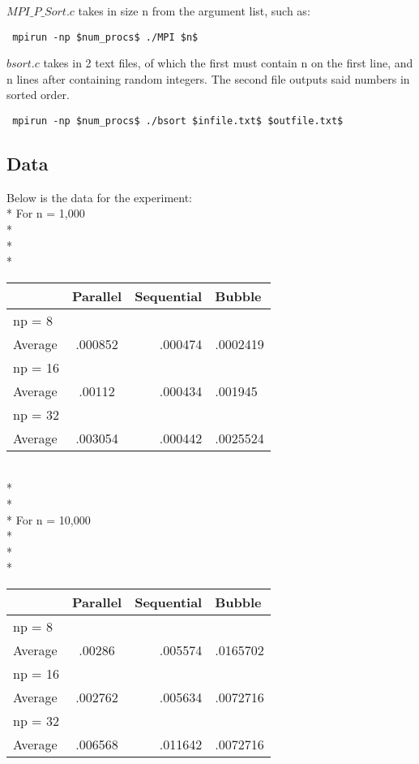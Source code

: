 \documentclass[dvips]{article}
\begin{document}
 $MPI\_P\_Sort.c$ takes in size n from the argument list, such as:
 \begin{verbatim}
 mpirun -np $num_procs$ ./MPI $n$
 \end{verbatim}

 $bsort.c$ takes in 2 text files, of which the first must contain n on the first line, and n lines after containing random integers.
 The second file outputs said numbers in sorted order.
 \begin{verbatim}
 mpirun -np $num_procs$ ./bsort $infile.txt$ $outfile.txt$
 \end{verbatim}

\subsection{Data}
Below is the data for the experiment:
\\*
For n = 1,000
\\*
\\*
\\*
\begin{tabular}{ l | c r l }
   & Parallel & Sequential & Bubble \\
  \hline
  np = 8  &  &  & \\
  Average & .000852 & .000474 & .0002419 \\
  \hline
  np = 16  &  &  & \\
  Average & .00112& .000434 & .001945 \\
  \hline
  np = 32  &  &  & \\
  Average & .003054 & .000442 & .0025524 \\
\end{tabular}
\\*
\\*
\\*
For n = 10,000
\\*
\\*
\\*
\begin{tabular}{ l | c r l }
   & Parallel & Sequential & Bubble \\
  \hline
  np = 8  &  &  & \\
  Average & .00286 & .005574 & .0165702 \\
  \hline
  np = 16  &  &  & \\
  Average & .002762 & .005634 & .0072716 \\
  \hline
  np = 32  &  &  & \\
  Average & .006568 & .011642 & .0072716 \\
\end{tabular}
\end{document}

